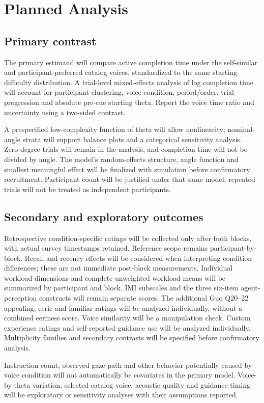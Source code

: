 \documentclass[11pt,letterpaper]{article}
\begin{document}
\section{Planned Analysis}
\subsection{Primary contrast}
The primary estimand will compare active completion time under the self-similar and participant-preferred catalog voices, standardized to the same starting-difficulty distribution. A trial-level mixed-effects analysis of log completion time will account for participant clustering, voice condition, period/order, trial progression and absolute pre-cue starting theta. Report the voice time ratio and uncertainty using a two-sided contrast.

A prespecified low-complexity function of theta will allow nonlinearity; nominal-angle strata will support balance plots and a categorical sensitivity analysis. Zero-degree trials will remain in the analysis, and completion time will not be divided by angle. The model's random-effects structure, angle function and smallest meaningful effect will be finalized with simulation before confirmatory recruitment. Participant count will be justified under that same model; repeated trials will not be treated as independent participants.

\subsection{Secondary and exploratory outcomes}
Retrospective condition-specific ratings will be collected only after both blocks, with actual survey timestamps retained. Reference scope remains participant-by-block. Recall and recency effects will be considered when interpreting condition differences; these are not immediate post-block measurements. Individual workload dimensions and complete unweighted workload means will be summarized by participant and block. IMI subscales and the three six-item agent-perception constructs will remain separate scores. The additional Guo Q20--22 appealing, eerie and familiar ratings will be analyzed individually, without a combined eeriness score. Voice similarity will be a manipulation check. Custom experience ratings and self-reported guidance use will be analyzed individually. Multiplicity families and secondary contrasts will be specified before confirmatory analysis.

Instruction count, observed gaze path and other behavior potentially caused by voice condition will not automatically be covariates in the primary model. Voice-by-theta variation, selected catalog voice, acoustic quality and guidance timing will be exploratory or sensitivity analyses with their assumptions reported.
\end{document}
